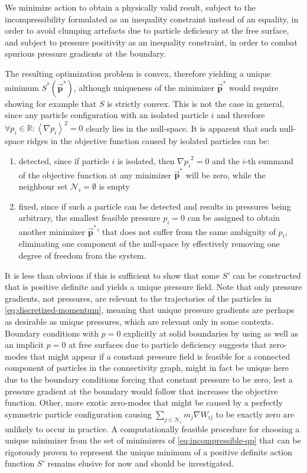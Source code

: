 \documentclass[conference]{IEEEtran}
\newcommand\vek[1]{\vec{\bm{#1}}}
\newcommand\br[1]{\left(#1\right)}
\newcommand\abr[1]{\left\langle#1\right\rangle}
\begin{document}
We minimize action to obtain a physically valid result, subject to the incompressibility formulated as an inequality constraint instead of an equality, in order to avoid clumping artefacts due to particle deficiency at the free surface, and subject to pressure positivity as an inequality constraint, in order to combat spurious pressure gradients at the boundary.



The resulting optimization problem is convex, therefore yielding a unique minimum $S^*\br{\vek{p}^*}$, although uniqueness of the minimizer $\vek{p}^*$ would require showing for example that $S$ is strictly convex. This is not the case in general, since any particle configuration with an isolated particle $i$ and therefore $\forall p_i \in\mathds{R}: \abr{\nabla p_i}^2 = 0$ clearly lies in the null-space. It is apparent that such null-space ridges in the objective function caused by isolated particles can be:
\begin{enumerate}
  \item detected, since if particle $i$ is isolated, then ${\nabla p_i}^2 = 0$ and the $i$-th summand of the objective function at any minimizer $\vek{p}^*$ will be zero, while the neighbour set $\mathcal{N}_i=\emptyset$ is empty
  \item fixed, since if such a particle can be detected and results in pressures being arbitrary, the smallest feasible pressure $p_i=0$ can be assigned to obtain another minimizer $\vek{p}^*\prime$ that does not suffer from the same ambiguity of $p_i$, eliminating one component of the null-space by effectively removing one degree of freedom from the system.
\end{enumerate}

It is less than obvious if this is sufficient to show that some $S\prime$ can be constructed that is positive definite and yields a unique pressure field. Note that only pressure gradients, not pressures, are relevant to the trajectories of the particles in \autoref{eq:discretized-momentum}, meaning that unique pressure gradients are perhaps as desirable as unique pressures, which are relevant only in some contexts. Boundary conditions with $p=0$ explicitly at solid boundaries by using \autocite[consistent boundaries]{consistent-boundaries} as well as an implicit $p=0$ at free surfaces due to particle deficiency suggests that zero-modes that might appear if a constant pressure field is feasible for a connected component of particles in the connectivity graph, might in fact be unique here due to the boundary conditions forcing that constant pressure to be zero, lest a pressure gradient at the boundary would follow that increases the objective function. 
Other, more exotic zero-modes that might be caused by a perfectly symmetric particle configuration causing $\sum_{j\in\mathcal{N}_i} m_j\nabla W_{ij}$ to be exactly zero are unlikely to occur in practice. 
A computationally feasible procedure for choosing a unique minimizer from the set of minimizers of \autoref{eq:incompressible-qp} that can be rigorously proven to represent the unique minimum of a positive definite action function $S\prime$ remains elusive for now and should be investigated.
\end{document}
